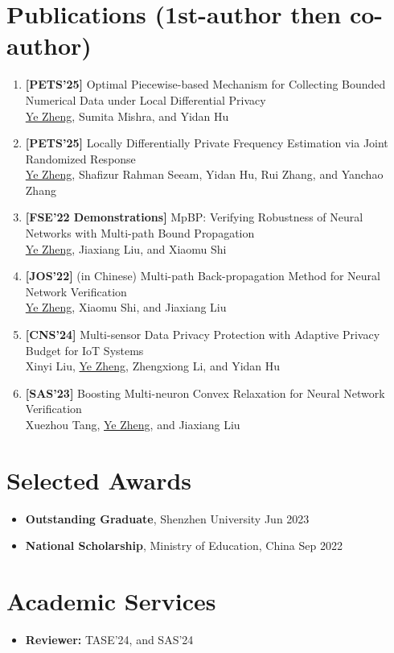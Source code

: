 \documentclass[a4paper,11pt]{article}
\begin{document}
\section{\textbf{Publications} \textnormal{\scriptsize (1st-author then co-author)}}

\begin{enumerate}[leftmargin=*,labelsep=2mm]
  \item \textbf{[PETS'25]} Optimal Piecewise-based Mechanism for Collecting Bounded Numerical Data under Local Differential Privacy \\
  \uline{Ye Zheng}, Sumita Mishra, and Yidan Hu
  \item \textbf{[PETS'25]} Locally Differentially Private Frequency Estimation via Joint Randomized Response \\
  \uline{Ye Zheng}, Shafizur Rahman Seeam, Yidan Hu, Rui Zhang, and Yanchao Zhang
  \item \textbf{[FSE'22 Demonstrations]} MpBP: Verifying Robustness of Neural Networks with Multi-path Bound Propagation \\
  \uline{Ye Zheng}, Jiaxiang Liu, and Xiaomu Shi
  \item \textbf{[JOS'22]} (in Chinese) Multi-path Back-propagation Method for Neural Network Verification \\
  \uline{Ye Zheng}, Xiaomu Shi, and Jiaxiang Liu
  \item \textbf{[CNS'24]} Multi-sensor Data Privacy Protection with Adaptive Privacy Budget for IoT Systems \\
  Xinyi Liu, \uline{Ye Zheng}, Zhengxiong Li, and Yidan Hu
  \item \textbf{[SAS'23]} Boosting Multi-neuron Convex Relaxation for Neural Network Verification \\
  Xuezhou Tang, \uline{Ye Zheng}, and Jiaxiang Liu
\end{enumerate}


\section{\textbf{Selected Awards}}

\begin{itemize}[leftmargin=0pt,label={}]
  \item \textbf{Outstanding Graduate}, Shenzhen University \hfill Jun 2023\vspace{-0.5em}
  \item \textbf{National Scholarship}, Ministry of Education, China \hfill Sep 2022
\end{itemize}


\section{\textbf{Academic Services}}

\begin{itemize}[leftmargin=0pt,label={}]
  \item \textbf{Reviewer:} TASE'24, and SAS'24
\end{itemize}
\end{document}
